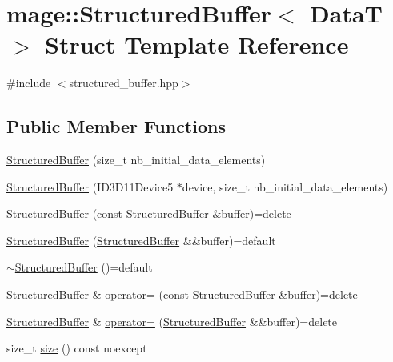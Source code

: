 \hypertarget{structmage_1_1_structured_buffer}{}\section{mage\+:\+:Structured\+Buffer$<$ DataT $>$ Struct Template Reference}
\label{structmage_1_1_structured_buffer}


{\ttfamily \#include $<$structured\+\_\+buffer.\+hpp$>$}

\subsection*{Public Member Functions}
\begin{DoxyCompactItemize}
\item 
\hyperlink{structmage_1_1_structured_buffer_ad384318eca9a617f61f81472ea68f32e}{Structured\+Buffer} (size\+\_\+t nb\+\_\+initial\+\_\+data\+\_\+elements)
\item 
\hyperlink{structmage_1_1_structured_buffer_af2b3ddd89bdca13ac79131d757ff4dce}{Structured\+Buffer} (I\+D3\+D11\+Device5 $\ast$device, size\+\_\+t nb\+\_\+initial\+\_\+data\+\_\+elements)
\item 
\hyperlink{structmage_1_1_structured_buffer_aa017416099a12305d0177094c768150e}{Structured\+Buffer} (const \hyperlink{structmage_1_1_structured_buffer}{Structured\+Buffer} \&buffer)=delete
\item 
\hyperlink{structmage_1_1_structured_buffer_a455bd930f39f5fdf6af4f453694997da}{Structured\+Buffer} (\hyperlink{structmage_1_1_structured_buffer}{Structured\+Buffer} \&\&buffer)=default
\item 
\hyperlink{structmage_1_1_structured_buffer_a02ab1d322e1aef0c608b85224b80dbcf}{$\sim$\+Structured\+Buffer} ()=default
\item 
\hyperlink{structmage_1_1_structured_buffer}{Structured\+Buffer} \& \hyperlink{structmage_1_1_structured_buffer_ac00255155ab1eb61244392adcf262d40}{operator=} (const \hyperlink{structmage_1_1_structured_buffer}{Structured\+Buffer} \&buffer)=delete
\item 
\hyperlink{structmage_1_1_structured_buffer}{Structured\+Buffer} \& \hyperlink{structmage_1_1_structured_buffer_a2647510e153d15b89f860e2a5c68e231}{operator=} (\hyperlink{structmage_1_1_structured_buffer}{Structured\+Buffer} \&\&buffer)=delete
\item 
size\+\_\+t \hyperlink{structmage_1_1_structured_buffer_a1e9ccab07c0f78ff1a8e4d8a0590f79e}{size} () const noexcept

\end{DoxyCompactItemize}
